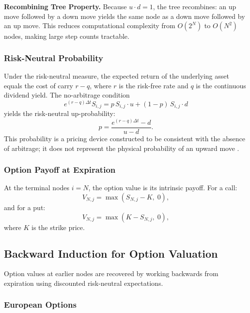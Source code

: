 \documentclass[10pt,twocolumn]{article}
\begin{document}
\textbf{Recombining Tree Property.} Because $u \cdot d = 1$, the tree
recombines: an up move followed by a down move yields the same node as a
down move followed by an up move. This reduces computational complexity
from $O(2^N)$ to $O(N^2)$ nodes, making large step counts tractable.

\subsubsection{Risk-Neutral Probability}

Under the risk-neutral measure, the expected return of the underlying asset
equals the cost of carry $r - q$, where $r$ is the risk-free rate and $q$ is
the continuous dividend yield. The no-arbitrage condition
%
\begin{equation}
e^{(r-q)\Delta t} S_{i,j} = p\,S_{i,j}\cdot u + (1-p)\,S_{i,j}\cdot d
\end{equation}
%
yields the risk-neutral up-probability:
%
\begin{equation}
p = \frac{e^{(r-q)\Delta t} - d}{u - d}.
\end{equation}
%
This probability is a pricing device constructed to be consistent with the
absence of arbitrage; it does not represent the physical probability of an
upward move \cite{hull2018}.

\subsubsection{Option Payoff at Expiration}

At the terminal nodes $i = N$, the option value is its intrinsic payoff.
For a call:
%
\begin{equation}
V_{N,j} = \max(S_{N,j} - K,\;0),
\end{equation}
%
and for a put:
%
\begin{equation}
V_{N,j} = \max(K - S_{N,j},\;0),
\end{equation}
%
where $K$ is the strike price.

\subsection{Backward Induction for Option Valuation}

Option values at earlier nodes are recovered by working backwards from
expiration using discounted risk-neutral expectations.

\subsubsection{European Options}
\end{document}
